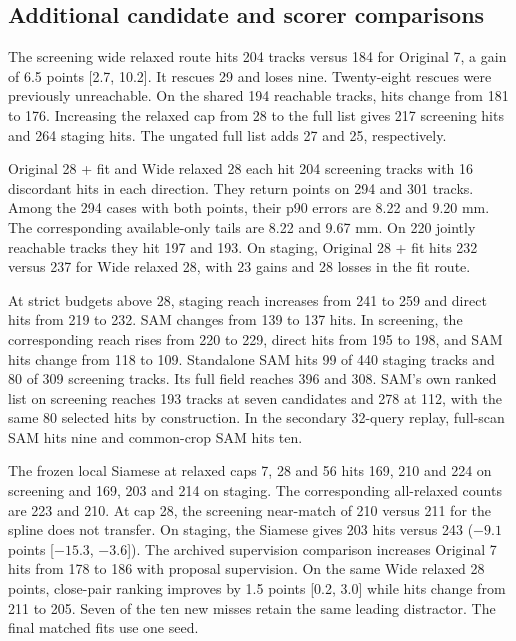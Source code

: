\subsection{Additional candidate and scorer comparisons}
The screening wide relaxed route hits 204 tracks versus 184 for Original 7, a gain of 6.5 points [2.7, 10.2]. It rescues 29 and loses nine. Twenty-eight rescues were previously unreachable. On the shared 194 reachable tracks, hits change from 181 to 176. Increasing the relaxed cap from 28 to the full list gives 217 screening hits and 264 staging hits. The ungated full list adds 27 and 25, respectively.

Original 28 + fit and Wide relaxed 28 each hit 204 screening tracks with 16 discordant hits in each direction. They return points on 294 and 301 tracks. Among the 294 cases with both points, their p90 errors are 8.22 and 9.20 mm. The corresponding available-only tails are 8.22 and 9.67 mm. On 220 jointly reachable tracks they hit 197 and 193. On staging, Original 28 + fit hits 232 versus 237 for Wide relaxed 28, with 23 gains and 28 losses in the fit route.

At strict budgets above 28, staging reach increases from 241 to 259 and direct hits from 219 to 232. SAM changes from 139 to 137 hits. In screening, the corresponding reach rises from 220 to 229, direct hits from 195 to 198, and SAM hits change from 118 to 109. Standalone SAM hits 99 of 440 staging tracks and 80 of 309 screening tracks. Its full field reaches 396 and 308. SAM's own ranked list on screening reaches 193 tracks at seven candidates and 278 at 112, with the same 80 selected hits by construction. In the secondary 32-query replay, full-scan SAM hits nine and common-crop SAM hits ten.

The frozen local Siamese at relaxed caps 7, 28 and 56 hits 169, 210 and 224 on screening and 169, 203 and 214 on staging. The corresponding all-relaxed counts are 223 and 210. At cap 28, the screening near-match of 210 versus 211 for the spline does not transfer. On staging, the Siamese gives 203 hits versus 243 ($-9.1$ points [$-15.3$, $-3.6$]). The archived supervision comparison increases Original 7 hits from 178 to 186 with proposal supervision. On the same Wide relaxed 28 points, close-pair ranking improves by 1.5 points [0.2, 3.0] while hits change from 211 to 205. Seven of the ten new misses retain the same leading distractor. The final matched fits use one seed.
